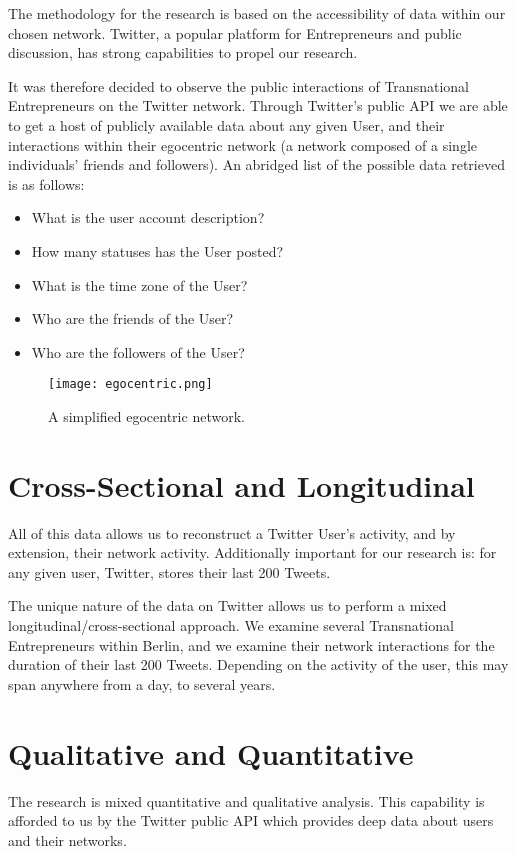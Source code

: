 The methodology for the research is based on the accessibility of data
within our chosen network. Twitter, a popular platform for
Entrepreneurs and public discussion, has strong capabilities to propel
our research.

It was therefore decided to observe the public interactions of
Transnational Entrepreneurs on the Twitter network. Through Twitter's
public API we are able to get a host of publicly available data about
any given User, and their interactions within their egocentric network
(a network composed of a single individuals' friends and
followers). An abridged list of the possible data retrieved is as
follows:

\begin{itemize}
\item What is the user account description?
\item How many statuses has the User posted?
\item What is the time zone of the User?
\item Who are the friends of the User?
\item Who are the followers of the User?
\end{itemize}

\begin{figure}[!ht]
  \centering
  \texttt{[image: egocentric.png]}
  \caption{A simplified egocentric network.}
\end{figure}

\section{Cross-Sectional and Longitudinal}
All of this data allows us to reconstruct a Twitter User's activity,
and by extension, their network activity. Additionally important for
our research is: for any given user, Twitter, stores their last
200 Tweets.

The unique nature of the data on Twitter allows us to perform a mixed
longitudinal/cross-sectional approach. We examine several
Transnational Entrepreneurs within Berlin, and we examine their
network interactions for the duration of their last 200
Tweets. Depending on the activity of the user, this may span anywhere
from a day, to several years.

\section{Qualitative and Quantitative}
The research is mixed quantitative and qualitative analysis. This
capability is afforded to us by the Twitter public API which provides
deep data about users and their networks.

